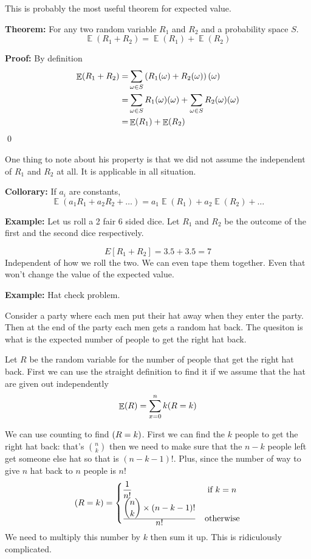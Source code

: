 \documentclass[a4paper, 12pt]{article}
\newcommand{\theorem}{\vspace{1em}\noindent\textbf{Theorem:} }
\newcommand{\collorary}{\vspace{1em}\noindent\textbf{Theorem:} }
\newcommand{\example}{\vspace{1em}\noindent\textbf{Example:} }
\renewcommand{\proof}{\vspace{0.5em}\noindent\textbf{Proof:} }
\renewcommand{\collorary}{\vspace{1em}\noindent\textbf{Collorary:} }
\newcommand{\qedd}{\qed\newline}
\let\Pr\relax
\DeclareMathOperator{\Pr}{Pr}
\DeclareMathOperator{\E}{\mathbb{E}}
\begin{document}
\begin{multicols}{2}
This is probably the most useful theorem for expected value.

\theorem For any two random variable $R_1$ and $R_2$ and a probability space $S$.
\[
	\E(R_1+R_2) = \E(R_1) + \E(R_2)
\]

\proof By definition
\begin{align*}
	\E(R_1+R_2) =& \sum_{\omega \in S} \left( R_1(\omega) + R_2(\omega) \right) \Pr(\omega)\\
	=& \sum_{\omega \in S} R_1(\omega)\Pr(\omega) + \sum_{\omega \in S}R_2(\omega) \Pr(\omega)\\
	=& \E(R_1) + \E(R_2)
\end{align*}
\qedd

One thing to note about his property is that we did not assume the independent of $R_1$ and $R_2$ at all. It is applicable in all situation.

\collorary If $a_i$ are constants,
\[
	\E (a_1 R_1 + a_2 R_2 + \ldots) = a_1 \E(R_1) + a_2 \E(R_2) + \ldots
\]

\example Let us roll a 2 fair 6 sided dice. Let $R_1$ and $R_2$ be the outcome of the first and the second dice respectively.

\[
	E[R_1 + R_2] = 3.5 + 3.5 = 7
\]
Independent of how we roll the two. We can even tape them together. Even that won't change the value of the expected value.

\example Hat check problem.

Consider a party where each men put their hat away when they enter the party. Then at the end of the party each men gets a random hat back. The quesiton is what is the expected number of people to get the right hat back.

Let $R$ be the random variable for the number of people that get the right hat back. First we can use the straight definition to find it if we assume that the hat are given out independently
\[
	\E(R) = \sum_{x=0}^{n} k \Pr(R=k)
\]

We can use counting to find $\Pr(R=k)$. First we can find the $k$ people to get the right hat back: that's $\displaystyle {n\choose k}$ then we need to make sure that the $n-k$ people left get someone else hat so that is $(n-k-1)!$. Plus, since the number of way to give $n$ hat back to $n$ people is $n!$
\[
	\Pr(R=k)=\begin{cases}\displaystyle
	\frac{1}{n!} & \text{ if } k=n\\
	\frac{ \displaystyle{n \choose k } \times (n-k-1)!}{\displaystyle n!} & \text{otherwise}
	\end{cases}
\]
We need to multiply this number by $k$ then sum it up. This is ridiculously complicated.


\end{multicols}
\end{document}
